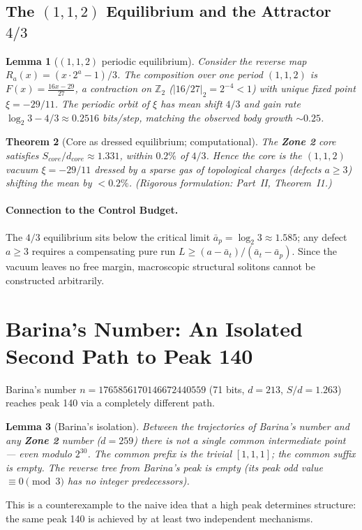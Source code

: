 \documentclass[12pt,a4paper]{article}
\newtheorem{theorem}{Theorem}[section]
\newtheorem{lemma}[theorem]{Lemma}
\theoremstyle{remark}
\begin{document}
\subsection{The $(1,1,2)$ Equilibrium and the Attractor $4/3$}
\begin{lemma}[$(1,1,2)$ periodic equilibrium]
Consider the reverse map $R_a(x)=(x\cdot 2^{a}-1)/3$. The composition over one period $(1,1,2)$ is $F(x)=\frac{16x-29}{27}$, a contraction on $\mathbb{Z}_2$ ($|16/27|_2=2^{-4}<1$) with unique fixed point $\xi=-29/11$. The periodic orbit of $\xi$ has mean shift $4/3$ and gain rate $\log_2 3-4/3\approx0.2516$ bits/step, matching the observed body growth $\sim0.25$.
\end{lemma}
\begin{theorem}[Core as dressed equilibrium; computational]
The \textbf{Zone 2} core satisfies $S_{core}/d_{core}\approx1.331$, within $0.2\%$ of $4/3$. Hence the core is the $(1,1,2)$ vacuum $\xi=-29/11$ dressed by a sparse gas of topological charges (defects $a\ge3$) shifting the mean by $<0.2\%$. (Rigorous formulation: Part~II, Theorem~I1.)
\end{theorem}
\paragraph{Connection to the Control Budget.}
The $4/3$ equilibrium sits below the critical limit $\bar a_p=\log_2 3\approx1.585$; any defect $a\ge3$ requires a compensating pure run $L \ge (a-\bar a_t)/(\bar a_t-\bar a_p)$. Since the vacuum leaves no free margin, macroscopic structural solitons cannot be constructed arbitrarily.

\section{Barina's Number: An Isolated Second Path to Peak 140}
Barina's number $n = 1765856170146672440559$ (71 bits, $d=213$, $S/d=1.263$) reaches peak 140 via a completely different path.
\begin{lemma}[Barina's isolation]
Between the trajectories of Barina's number and any \textbf{Zone 2} number ($d=259$) there is not a single common intermediate point --- even modulo $2^{30}$. The common prefix is the trivial $[1,1,1]$; the common suffix is empty. The reverse tree from Barina's peak is empty (its peak odd value $\equiv0\pmod3$ has no integer predecessors).
\end{lemma}
This is a counterexample to the naive idea that a high peak determines structure: the same peak 140 is achieved by at least two independent mechanisms.
\end{document}
